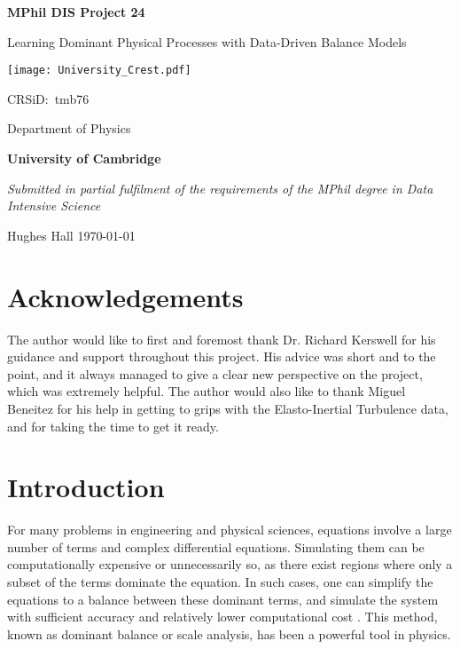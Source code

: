 \documentclass[12pt]{report} %
\begin{document}
\begin{titlepage}
  \centering
  {\LARGE\bfseries MPhil DIS Project 24\par}
  {\LARGE Learning Dominant Physical Processes with Data-Driven Balance Models\par}
  \vspace{1cm}
  {\texttt{[image: University\_Crest.pdf]}\par}
  {\Large CRSiD:\ tmb76\par}
  \vspace{1cm}
  {\Large Department of Physics\par}
  {\Large\bfseries University of Cambridge\par}
  \vfill
  {\itshape Submitted in partial fulfilment of the requirements of the MPhil degree in Data Intensive Science}
  \vfill
  {\large Hughes Hall  \hspace{6cm} \today\par}
\end{titlepage}

\chapter*{Acknowledgements}

The author would like to first and foremost thank Dr. Richard Kerswell for his guidance and support throughout this project. His advice was short and to the point, and it always managed to give a clear new perspective on the project, which was extremely helpful. The author would also like to thank Miguel Beneitez for his help in getting to grips with the Elasto-Inertial Turbulence data, and for taking the time to get it ready.

\tableofcontents


\chapter{Introduction}


For many problems in engineering and physical sciences, equations involve a large number of terms and complex differential equations. Simulating them can be computationally expensive or unnecessarily so, as there exist regions where only a subset of the terms dominate the equation. In such cases, one can simplify the equations to a balance between these dominant terms, and simulate the system with sufficient accuracy and relatively lower computational cost \cite{charney1990scale}. This method, known as dominant balance or scale analysis, has been a powerful tool in physics.
\end{document}
